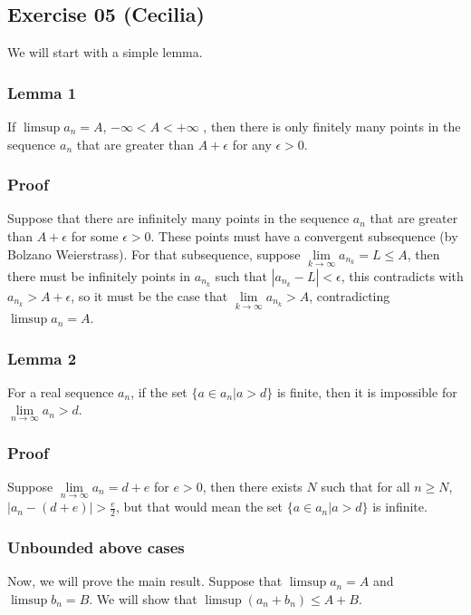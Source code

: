 \subsection*{Exercise 05 (Cecilia)}
We will start with a simple lemma.

\subsubsection*{Lemma 1}
If $ \limsup a_n = A $, $ -\infty < A < +\infty $ , then there is only finitely many points in the sequence $ a_n $ that are greater than $ A + \epsilon $ for any $ \epsilon > 0 $.

\subsubsection*{Proof}
Suppose that there are infinitely many points in the sequence $ a_n $ that are greater than $ A + \epsilon $ for some $ \epsilon > 0 $. These points must have a convergent subsequence (by Bolzano Weierstrass). For that subsequence, suppose $ \lim\limits_{k \to \infty} a_{n_k} = L \le A $, then there must be infinitely points in $ a_{n_k} $ such that $ |a_{n_k} - L| < \epsilon $, this contradicts with $ a_{n_k} > A + \epsilon $, so it must be the case that $ \lim\limits_{k \to \infty} a_{n_k} > A $, contradicting $ \limsup a_n = A $.

\subsubsection*{Lemma 2}
For a real sequence $ a_n $, if the set $ \{ a \in a_n | a > d \} $ is finite, then it is impossible for $ \lim\limits_{n \to \infty} a_n > d $.

\subsubsection*{Proof}
Suppose $ \lim\limits_{n \to \infty} a_n = d + e $ for $ e > 0 $, then there exists $ N $ such that for all $ n \ge N $, $ |a_n - (d + e)| > \frac{e}{2} $, but that would mean the set $ \{ a \in a_n | a > d \} $ is infinite.

\subsubsection*{Unbounded above cases}
Now, we will prove the main result. Suppose that $ \limsup a_n = A $ and $ \limsup b_n = B $. We will show that $ \limsup (a_n + b_n) \leq A + B $.

